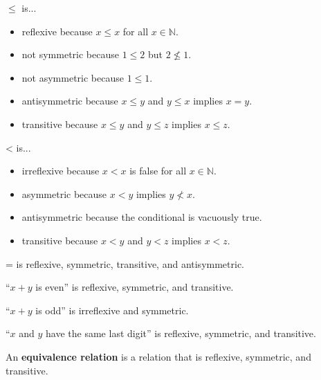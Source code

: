 
\begin{eg}
	\( \le  \) is...
\end{eg}

\begin{itemize}
	\item reflexive because \( x\le x \) for all \( x \in \mathbb{N} \).
	\item not symmetric because \( 1 \le 2 \) but \( 2 \not\le 1 \).
	\item not asymmetric because \( 1 \le 1 \).
	\item antisymmetric because \( x \le y \) and \( y \le x \) implies \( x = y \).
	\item transitive because \( x \le y \) and \( y \le z \) implies \( x \le z \).
\end{itemize}

\begin{eg}
	< is...
\end{eg}

\begin{itemize}
	\item irreflexive because \( x < x \) is false for all \( x \in \mathbb{N} \).
	\item asymmetric because \( x < y \) implies \( y \not< x \).
	\item antisymmetric because the conditional is vacuously true.
	\item transitive because \( x < y \) and \( y < z \) implies \( x < z \).
\end{itemize}

\begin{eg}
	= is reflexive, symmetric, transitive, and antisymmetric.
\end{eg}

\begin{eg}
	``\( x + y \) is even'' is reflexive, symmetric, and transitive.
\end{eg}

\begin{eg}
	``\( x+y \) is odd'' is irreflexive and symmetric.
\end{eg}

\begin{eg}
	``\( x \) and \( y \) have the same last digit'' is reflexive, symmetric, and transitive.
\end{eg}

\begin{definition}
	An \textbf{equivalence relation} is a relation that is reflexive, symmetric, and transitive.
\end{definition}

